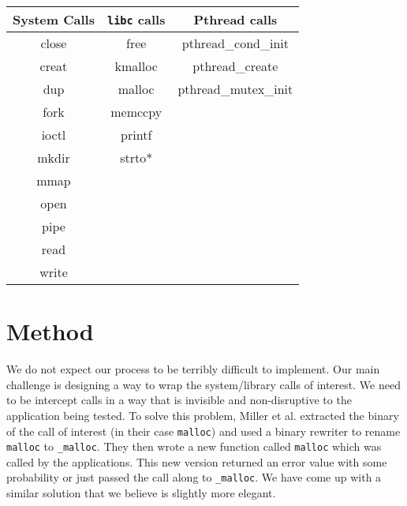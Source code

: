 \documentclass[10pt]{article}
\newenvironment{allintypewriter}{\ttfamily}{\par}
\begin{document}
\begin{center}
	\begin{allintypewriter}
	\begin{tabular}{|c |c | c|}
	\hline
	System Calls & \texttt{libc} calls & Pthread calls \\ \hline \hline
	close & free& pthread\_cond\_init\\ 
	creat & kmalloc& pthread\_create\\
	dup & malloc&pthread\_mutex\_init\\
	fork & memccpy&\\
	ioctl & printf&\\
	mkdir & strto*&\\
	mmap & &\\
 	open & &\\
	pipe & &\\
	read & &\\
	write & &\\ \hline
	\end{tabular}
	\end{allintypewriter}
\end{center}

\section{Method}
We do not expect our process to be terribly difficult to implement. Our main challenge is designing a way to wrap the system/library calls of interest. We need to be intercept calls in a way that is invisible and non-disruptive to the application being tested. To solve this problem, Miller et al. extracted the binary of the call of interest (in their case \texttt{malloc}) and used a binary rewriter to rename \texttt{malloc} to \texttt{\_malloc}. They then wrote a new function called \texttt{malloc} which was called by the applications. This new version returned an error value with some probability or just passed the call along to \texttt{\_malloc}. We have come up with a similar solution that we believe is slightly more elegant.
\end{document}
